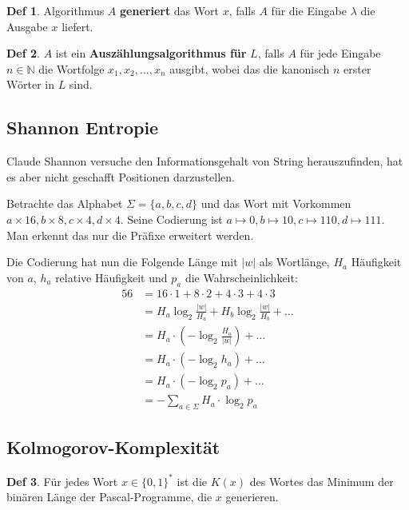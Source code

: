 \documentclass[a4paper, 10pt]{article}
\theoremstyle{definition}
\newtheorem{definition}{Def}[section]
\newcommand{\N}{\mathbb{N}}
\newcommand{\A}{\Sigma}
\begin{document}
\begin{definition}
    Algorithmus \(A\) \textbf{generiert} das Wort \(x\), falls \(A\) für die Eingabe \(\lambda\) die Ausgabe \(x\) liefert.
\end{definition}

\begin{definition}
    \(A\) ist ein \textbf{Auszählungsalgorithmus für} \(L\), falls \(A\) für jede Eingabe \(n \in \N\) die Wortfolge \(x_1, x_2, \ldots, x_n\) ausgibt, wobei das die kanonisch \(n\) erster Wörter in \(L\) sind.
\end{definition}

\subsection*{Shannon Entropie}
Claude Shannon versuche den Informationsgehalt von String herauszufinden, hat es aber nicht geschafft Positionen darzustellen.

Betrachte das Alphabet \(\A = \{a, b, c, d\}\) und das Wort mit Vorkommen \(a \times 16, b \times 8, c \times 4, d \times 4\). Seine Codierung ist \(a \mapsto 0, b \mapsto 10, c \mapsto 110, d \mapsto 111\). Man erkennt das nur die Präfixe erweitert werden.

Die Codierung hat nun die Folgende Länge mit \(|w|\) als Wortlänge, \(H_a\) Häufigkeit von \(a\), \(h_a\) relative Häufigkeit und \(p_a\) die Wahrscheinlichkeit:
\begin{align*}
    56 &= 16 \cdot 1 + 8 \cdot 2 + 4 \cdot 3 + 4 \cdot 3 \\
    &= H_a \log_2\frac{|w|}{H_a} +  H_b \log_2\frac{|w|}{H_b} + \ldots \\
    &= H_a \cdot (- \log_2 \frac{H_a}{|w|}) + \ldots \\
    &= H_a \cdot (- \log_2 h_a) + \ldots \\
    &= H_a \cdot (- \log_2 p_a) + \ldots \\
    &= - \sum_{a \in \A} H_a \cdot \log_2 p_a
\end{align*}

\subsection*{Kolmogorov-Komplexität}
\begin{definition}
    Für jedes Wort \(x \in \{0, 1\}^*\) ist die \(K(x)\) des Wortes das Minimum der binären Länge der Pascal-Programme, die \(x\) generieren.
\end{definition}
\end{document}
